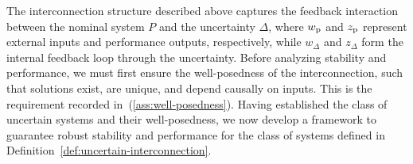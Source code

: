 The interconnection structure described above captures the feedback interaction
between the nominal system $P$ and the uncertainty $\Delta$, where $w_{{\mathrm{p}}}$ and $z_{{\mathrm{p}}}$
represent external inputs and performance outputs, respectively, while
$w_\Delta$ and $z_\Delta$ form the internal feedback loop through the
uncertainty.
Before analyzing stability and performance, we must first ensure the
well-posedness of the interconnection, such that solutions exist, are unique,
and depend causally on inputs. This is the requirement recorded
in~(\ref{ass:well-posedness}).
Having established the class of uncertain systems and their well-posedness, we
now develop a framework to guarantee robust stability and performance for the
class of systems defined in Definition~\ref{def:uncertain-interconnection}.



